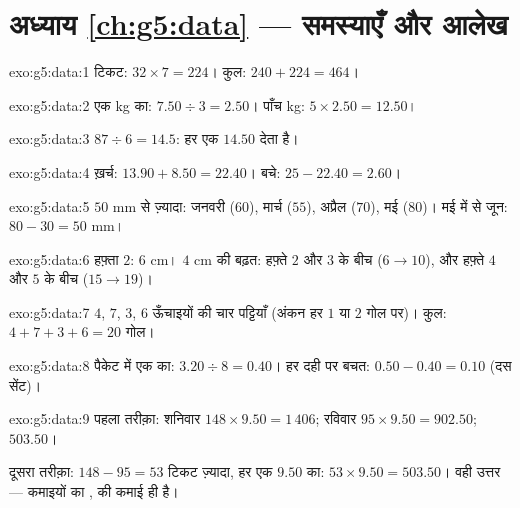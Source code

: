\section*{अध्याय \ref{ch:g5:data} --- समस्याएँ और आलेख}

\begin{solution}{exo:g5:data:1}
टिकट: $32 \times 7 = 224$। कुल: $240 + 224 = 464$।
\end{solution}

\begin{solution}{exo:g5:data:2}
एक kg का: $7.50 \div 3 = 2.50$। पाँच kg:
$5 \times 2.50 = 12.50$।
\end{solution}

\begin{solution}{exo:g5:data:3}
$87 \div 6 = 14.5$: हर एक $14.50$ देता है।
\end{solution}

\begin{solution}{exo:g5:data:4}
ख़र्च: $13.90 + 8.50 = 22.40$। बचे: $25 - 22.40 = 2.60$।
\end{solution}

\begin{solution}{exo:g5:data:5}
$50$ mm से ज़्यादा: जनवरी ($60$), मार्च ($55$), अप्रैल ($70$),
मई ($80$)। मई में से जून: $80 - 30 = 50$ mm।
\end{solution}

\begin{solution}{exo:g5:data:6}
हफ़्ता $2$: $6$ cm। $4$ cm की बढ़त: हफ़्ते $2$ और $3$ के बीच
($6 \to 10$), और हफ़्ते $4$ और $5$ के बीच ($15 \to 19$)।
\end{solution}

\begin{solution}{exo:g5:data:7}
$4$, $7$, $3$, $6$ ऊँचाइयों की चार पट्टियाँ (अंकन हर $1$ या
$2$ गोल पर)। कुल: $4 + 7 + 3 + 6 = 20$ गोल।
\end{solution}

\begin{solution}{exo:g5:data:8}
पैकेट में एक का: $3.20 \div 8 = 0.40$। हर दही पर बचत:
$0.50 - 0.40 = 0.10$ (दस सेंट)।
\end{solution}

\begin{solution}{exo:g5:data:9}
पहला तरीक़ा: शनिवार $148 \times 9.50 = 1\,406$; रविवार
$95 \times 9.50 = 902.50$;  $503.50$।

दूसरा तरीक़ा: $148 - 95 = 53$ टिकट ज़्यादा, हर एक $9.50$ का:
$53 \times 9.50 = 503.50$। वही उत्तर --- कमाइयों का ,
 की कमाई ही है।
\end{solution}


